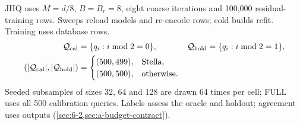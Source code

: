 JHQ uses $M=d/8$, $B=B_r=8$, eight coarse iterations and 100,000 residual-training rows. Sweeps reload models and re-encode rows; cold builds refit. Training uses database rows. \[
 \begin{aligned}
 \mathcal Q_{\rm cal}&=\{q_i:i\bmod2=0\},&
 \mathcal Q_{\rm hold}&=\{q_i:i\bmod2=1\},\\
 (|\mathcal Q_{\rm cal}|,|\mathcal Q_{\rm hold}|)
 &=\begin{cases}(500,499),&\text{Stella},\\(500,500),&\text{otherwise}.\end{cases}
 \end{aligned}
 \]
Seeded subsamples of sizes
32, 64 and 128 are drawn 64 times per cell; FULL uses all 500 calibration
queries. Labels assess the oracle and holdout; agreement uses outputs (\cref{sec:6-2,sec:a-budget-contract}).

